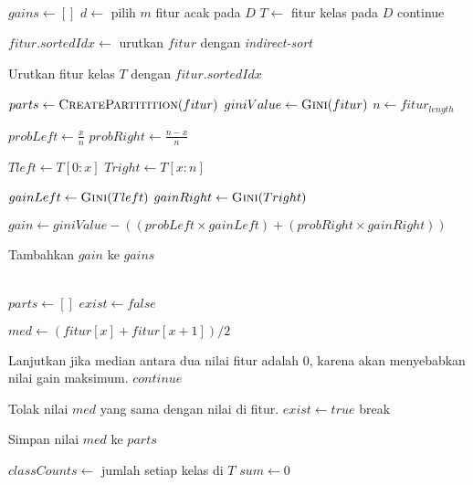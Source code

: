 \begin{center}
\begin{algorithmic}[1]
	\State {}
\EndFunction
\\
	\State $ gains \gets [] $
	\State $ d \gets $ pilih $m$ fitur acak pada $D$
	\State $ T \gets $ fitur kelas pada $D$
			\State continue
		\EndIf

		\State $ fitur.sortedIdx \gets $ urutkan $fitur$ dengan
		\textit{indirect-sort}

		\State Urutkan fitur kelas $T$ dengan $fitur.sortedIdx$

		\State $ parts \gets \Call{CreatePartitition}{fitur} $
		\State $ giniValue \gets \Call{Gini}{fitur} $
		\State $ n \gets fitur_{length} $

			\State $ probLeft \gets \frac{x}{n} $
			\State $ probRight \gets \frac{n-x}{n} $

			\State $ Tleft \gets T[0:x] $
			\State $ Tright \gets T[x:n] $

			\State $ gainLeft \gets \Call{Gini}{Tleft} $
			\State $ gainRight \gets \Call{Gini}{Tright} $

			\State $ gain \gets giniValue - ((probLeft \times gainLeft) +
			(probRight \times gainRight)) $

			\State Tambahkan $gain$ ke $gains$
		\EndFor
	\EndFor

	\State {}
\EndFunction
\\
	\State $ parts \gets [] $
	\State $ exist \gets false $

		\State $ med \gets (fitur[x] + fitur[x+1]) / 2 $

			\Comment Lanjutkan jika median antara dua nilai fitur
			adalah 0, karena akan menyebabkan nilai gain maksimum.
			\State $continue$
		\EndIf

				\Comment Tolak nilai $med$ yang sama dengan
				nilai di fitur.
				\State $ exist \gets true $
				\State break
			\EndIf
		\EndFor

			\State Simpan nilai $med$ ke $parts$
		\EndIf
	\EndFor

	\State {}
\EndFunction
\pagebreak
{}
		\State {}
	\EndIf

	\State $ classCounts \gets $ jumlah setiap kelas di $T$
	\State $ sum \gets 0 $


\end{algorithmic}
\end{center}
